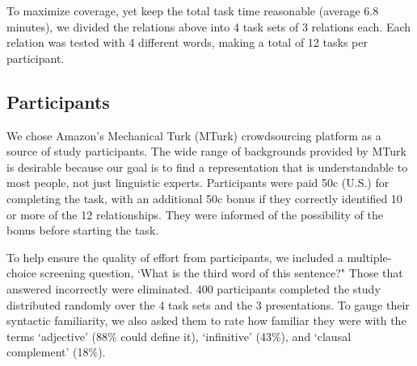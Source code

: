 To maximize coverage, yet keep the total task time reasonable (average 6.8 minutes), we divided the relations above into 4 task sets of 3 relations each. Each relation was tested with 4 different words, making a total of 12 tasks per participant.

\subsection{Participants}
We chose Amazon's Mechanical Turk (MTurk) crowdsourcing platform as a source of study participants. The wide range of backgrounds provided by MTurk is desirable because our goal is to find a representation that is understandable to most people, not just linguistic experts. Participants were paid 50c (U.S.) for completing the task, with an additional 50c bonus if they correctly identified 10 or more of the 12 relationships. They were informed of the possibility of the bonus before starting the task.

To help ensure the quality of effort from participants, we included a multiple-choice screening question, `What is the third word of this sentence?"  Those that answered incorrectly were eliminated. 400 participants completed the study distributed randomly over the 4 task sets and the 3 presentations. To gauge their syntactic familiarity, we also asked them to rate how familiar they were with the terms `adjective' (88\% could define it), `infinitive' (43\%), and `clausal complement' (18\%).

